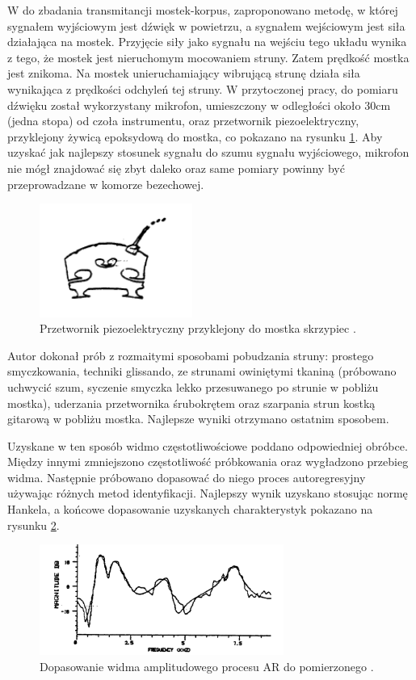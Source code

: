 W \cite{bowed_smith} do zbadania transmitancji mostek-korpus, zaproponowano metodę, w której sygnałem wyjściowym jest dźwięk w powietrzu, a sygnałem wejściowym jest siła działająca na mostek. Przyjęcie siły jako sygnału na wejściu tego układu wynika z tego, że mostek jest nieruchomym mocowaniem struny. Zatem prędkość mostka jest znikoma. Na mostek unieruchamiający wibrującą strunę działa siła wynikająca z prędkości odchyleń tej struny. W przytoczonej pracy, do pomiaru dźwięku został wykorzystany mikrofon, umieszczony w odległości około 30cm (jedna stopa) od czoła instrumentu, oraz przetwornik piezoelektryczny, przyklejony żywicą epoksydową do mostka, co pokazano na rysunku \ref{rys:pomiary}. Aby uzyskać jak najlepszy stosunek sygnału do szumu sygnału wyjściowego, mikrofon nie mógł znajdować się zbyt daleko oraz same pomiary powinny być przeprowadzane w komorze bezechowej.

\begin{figure}[H]
	\centering
	\includegraphics[width=5cm]{grafiki/pomiary}
	\captionsetup{justification=centering}
	\caption{Przetwornik piezoelektryczny przyklejony do mostka skrzypiec \cite{bowed_smith}.}
	\label{rys:pomiary}
\end{figure}

Autor \cite{bowed_smith} dokonał prób z rozmaitymi sposobami pobudzania struny: prostego smyczkowania, techniki glissando, ze strunami owiniętymi tkaniną (próbowano uchwycić szum, syczenie smyczka lekko przesuwanego po strunie w pobliżu mostka), uderzania przetwornika śrubokrętem oraz szarpania strun kostką gitarową w pobliżu mostka. Najlepsze wyniki otrzymano ostatnim sposobem.

Uzyskane w ten sposób widmo częstotliwościowe poddano odpowiedniej obróbce. Między innymi zmniejszono częstotliwość próbkowania oraz wygładzono przebieg widma. Następnie próbowano dopasować do niego proces autoregresyjny używając różnych metod identyfikacji. Najlepszy wynik uzyskano stosując normę Hankela, a końcowe dopasowanie uzyskanych charakterystyk pokazano na rysunku \ref{rys:hankel}.

\begin{figure}[H]
	\centering
	\includegraphics[width=8cm]{grafiki/hankel}
	\captionsetup{justification=centering}
	\caption{Dopasowanie widma amplitudowego procesu AR do pomierzonego \cite{bowed_smith}.}
	\label{rys:hankel}
\end{figure}

